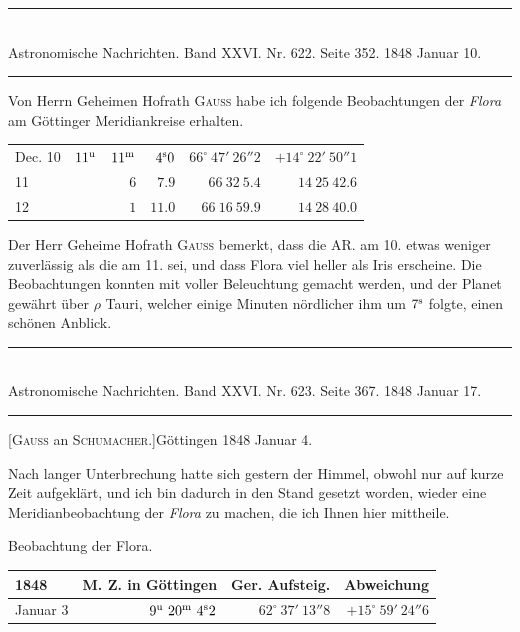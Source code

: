 \clearpage
{}
\begin{center}
\rule{0.55\linewidth}{0.4pt}\\[2pt]
Astronomische Nachrichten. Band XXVI. Nr. 622. Seite 352. 1848 Januar 10.\\[2pt]
\rule{0.55\linewidth}{0.4pt}
\end{center}

Von Herrn Geheimen Hofrath \textsc{Gauss} habe ich folgende Beobachtungen der \emph{Flora} am Göttinger Meridiankreise erhalten.

\begin{center}
\setlength{\tabcolsep}{4pt}
\begin{tabular}{l|r r r|r|r}
Dec. 10 & $11^{\rm u}$ & $11^{\rm m}$ & $4^{\rm s}0$ & $66^\circ\ 47'\ 26''2$ & $+14^\circ\ 22'\ 50''1$ \\
\hfill 11 & & $6$ & $7.9$ & $66\ 32\ 5.4$ & $14\ 25\ 42.6$ \\
\hfill 12 & & $1$ & $11.0$ & $66\ 16\ 59.9$ & $14\ 28\ 40.0$ \\
\end{tabular}
\end{center}

Der Herr Geheime Hofrath \textsc{Gauss} bemerkt, dass die AR. am 10. etwas weniger zuverlässig als die am 11. sei, und dass Flora viel heller als Iris erscheine. Die Beobachtungen konnten mit voller Beleuchtung gemacht werden, und der Planet gewährt über $\rho$ Tauri, welcher einige Minuten nördlicher ihm um $7^{\rm s}$ folgte, einen schönen Anblick.

\clearpage
\hypertarget{native-481-january4}{}
\begin{center}
\rule{0.55\linewidth}{0.4pt}\\[2pt]
Astronomische Nachrichten. Band XXVI. Nr. 623. Seite 367. 1848 Januar 17.\\[2pt]
\rule{0.55\linewidth}{0.4pt}
\end{center}
\begin{center}[\textsc{Gauss} an \textsc{Schumacher}.]\quad Göttingen 1848 Januar 4.\end{center}

Nach langer Unterbrechung hatte sich gestern der Himmel, obwohl nur auf kurze Zeit aufgeklärt, und ich bin dadurch in den Stand gesetzt worden, wieder eine Meridianbeobachtung der \emph{Flora} zu machen, die ich Ihnen hier mittheile.

\begin{center}
Beobachtung der Flora.\\[3pt]
\setlength{\tabcolsep}{4pt}
\begin{tabular}{l|r|r|r}
1848 & M. Z. in Göttingen & Ger. Aufsteig. & Abweichung \\\hline
Januar 3 & $9^{\rm u}\ 20^{\rm m}\ 4^{\rm s}2$ & $62^\circ\ 37'\ 13''8$ & $+15^\circ\ 59'\ 24''6$ \\
\end{tabular}
\end{center}

